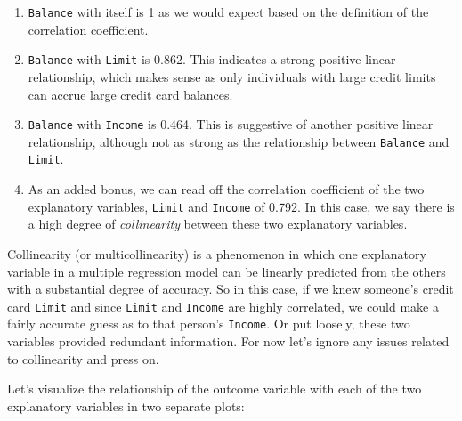 \documentclass[12pt,]{krantz}
\providecommand{\tightlist}{%
  \setlength{\itemsep}{0pt}\setlength{\parskip}{0pt}}
\theoremstyle{definition}
\theoremstyle{definition}
\theoremstyle{definition}
\theoremstyle{remark}
\begin{document}
\begin{enumerate}
\def\labelenumi{\arabic{enumi}.}
\tightlist
\item
  \texttt{Balance} with itself is 1 as we would expect based on the
  definition of the correlation coefficient.
\item
  \texttt{Balance} with \texttt{Limit} is 0.862. This indicates a strong
  positive linear relationship, which makes sense as only individuals
  with large credit limits can accrue large credit card balances.
\item
  \texttt{Balance} with \texttt{Income} is 0.464. This is suggestive of
  another positive linear relationship, although not as strong as the
  relationship between \texttt{Balance} and \texttt{Limit}.
\item
  As an added bonus, we can read off the correlation coefficient of the
  two explanatory variables, \texttt{Limit} and \texttt{Income} of
  0.792. In this case, we say there is a high degree of
  \emph{collinearity} between these two explanatory variables.
\end{enumerate}

Collinearity (or multicollinearity) is a phenomenon in which one
explanatory variable in a multiple regression model can be linearly
predicted from the others with a substantial degree of accuracy. So in
this case, if we knew someone's credit card \texttt{Limit} and since
\texttt{Limit} and \texttt{Income} are highly correlated, we could make
a fairly accurate guess as to that person's \texttt{Income}. Or put
loosely, these two variables provided redundant information. For now
let's ignore any issues related to collinearity and press on.

Let's visualize the relationship of the outcome variable with each of
the two explanatory variables in two separate plots:
\end{document}
